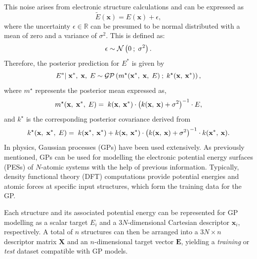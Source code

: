 This noise arises from electronic structure calculations and can be expressed as \[\tilde{E}(\mathbf{x})=E(\mathbf{x})+ \epsilon,\] where the uncertainty $\epsilon\in\mathbb{R}$ can be presumed to be normal distributed with a mean of zero and a variance of $\sigma^{2}$.
This is defined as:
\begin{equation}
    \label{equ:2.34}
        \epsilon\\
        \;\mathtt{\sim}\;
        \mathcal{N}\left(0\:
         ;\; \sigma^{2}\\
             \right).
\end{equation}
Therefore, the posterior prediction for $E^{*}$ is given by
\begin{equation}
    \label{equ:2.35}
        E^{*}|\;\mathbf{x}^{*},\;\mathbf{x},\;E\\
        \;\mathtt{\sim}\;
        \mathcal{GP}\left(
        m^{\star}(\mathbf{x}^{*},\;\mathbf{x},\;E)\:
         ;\; k^{\star}(\mathbf{x},\:\mathbf{x}^{*})\\
             \right),
\end{equation}
where $m^{\star}$ represents the posterior mean expressed as,
\begin{equation}
    \label{equ:2.36}
        m^{\star}(\mathbf{x},\;\mathbf{x}^{*},\;E)\:\\
         = \; k(\mathbf{x},\:\mathbf{x}^{*})\cdot\left(k(\mathbf{x},\:\mathbf{x})+\sigma^{2}\right)^{-1}\cdot E,
\end{equation}
and $k^{\star}$ is the corresponding posterior covariance derived from
\begin{equation}
    \label{equ:2.37}
        k^{\star}(\mathbf{x},\;\mathbf{x}^{*},\;E)\:\\
         = \; k(\mathbf{x}^{*},\:\mathbf{x}^{*}) + k(\mathbf{x},\:\mathbf{x}^{*})\cdot\left(k(\mathbf{x},\:\mathbf{x})+\sigma^{2}\right)^{-1}\cdot k(\mathbf{x}^{*},\:\mathbf{x}).
\end{equation}
In physics, Gaussian processes (GPs) have been used extensively. As previously mentioned, GPs can be used for modelling the electronic potential energy surfaces (PESs) of \(N\)-atomic systems with the help of previous information.
Typically, density functional theory (DFT) computations provide potential energies and atomic forces at specific input structures, which form the training data for the GP.

Each structure and its associated potential energy can be represented for GP modelling as a scalar target \(E_{i}\) and a \(3N\)-dimensional Cartesian descriptor \(\mathbf{x}_{i}\), respectively.
A total of \(n\) structures can then be arranged into a \(3N \times n\) descriptor matrix \(\mathbf{X}\) and an \(n\)-dimensional target vector \(\mathbf{E}\), yielding a \textit{training} or \textit{test} dataset compatible with GP models.

